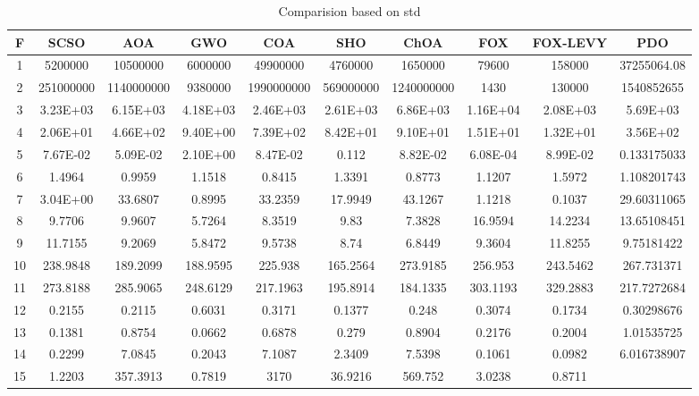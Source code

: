 \documentclass[
]{article}
\begin{document}
\begin{justify}
{\begin{table}[h!]
\begin{tabular}{||c c c c c c c c c c||}
\hline
\end{tabular}
\end{table}

\vspace{1cm}

\begin{table}[h!]
\caption{Comparision based on std}
\scriptsize %
\begin{tabular}{||c c c c c c c c c c||}
\hline
F & SCSO  & AOA & GWO & COA & SHO & ChOA & FOX & FOX-LEVY & PDO\\ [1ex]
\hline\hline
1 & 5200000 & 10500000 & 6000000 & 49900000 & 4760000 & 1650000 & 79600 &
  158000 & 37255064.08 \\ 2 & 251000000 & 1140000000 & 9380000 & 1990000000 &
  569000000 & 1240000000 & 1430 & 130000 & 1540852655 \\ 3 & 3.23E+03 & 6.15E+03
  & 4.18E+03 & 2.46E+03 & 2.61E+03 & 6.86E+03 & 1.16E+04 & 2.08E+03 & 5.69E+03\\ 
  4 & 2.06E+01 & 4.66E+02 & 9.40E+00 & 7.39E+02 & 8.42E+01 & 9.10E+01 &
  1.51E+01 & 1.32E+01 & 3.56E+02 \\ 5 & 7.67E-02 & 5.09E-02 & 2.10E+00 & 8.47E-02
  & 0.112 & 8.82E-02 & 6.08E-04 & 8.99E-02 & 0.133175033\\  6 & 1.4964 & 0.9959 &
  1.1518 & 0.8415 & 1.3391 & 0.8773 & 1.1207 & 1.5972 & 1.108201743 \\ 7 &
  3.04E+00 & 33.6807 & 0.8995 & 33.2359 & 17.9949 & 43.1267 & 1.1218 & 0.1037
  & 29.60311065 \\ 8 & 9.7706 & 9.9607 & 5.7264 & 8.3519 & 9.83 & 7.3828 &
  16.9594 & 14.2234 & 13.65108451\\  9 & 11.7155 & 9.2069 & 5.8472 & 9.5738 &
  8.74 & 6.8449 & 9.3604 & 11.8255 & 9.75181422 \\ 10 & 238.9848 & 189.2099 &
  188.9595 & 225.938 & 165.2564 & 273.9185 & 256.953 & 243.5462 & 267.731371\\ 
  11 & 273.8188 & 285.9065 & 248.6129 & 217.1963 & 195.8914 & 184.1335 &
  303.1193 & 329.2883 & 217.7272684\\  12 & 0.2155 & 0.2115 & 0.6031 & 0.3171 &
  0.1377 & 0.248 & 0.3074 & 0.1734 & 0.30298676 \\ 13 & 0.1381 & 0.8754 & 0.0662
  & 0.6878 & 0.279 & 0.8904 & 0.2176 & 0.2004 & 1.01535725\\  14 & 0.2299 &
  7.0845 & 0.2043 & 7.1087 & 2.3409 & 7.5398 & 0.1061 & 0.0982 & 6.016738907\\ 
  15 & 1.2203 & 357.3913 & 0.7819 & 3170 & 36.9216 & 569.752 & 3.0238 & 0.8711

\end{tabular}
\end{table}}
\end{justify}
\end{document}
